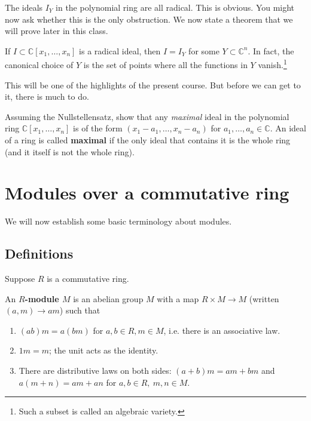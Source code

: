 The ideals $I_Y$ in the polynomial ring are all radical. This is obvious. You
might now ask whether this is the only obstruction. We now state a theorem that
we will prove later in this class.

\begin{theorem} If $I \subset \mathbb{C}[x_1, \dots,
x_n]$ is a radical ideal, then $I = I_Y$ for some $Y \subset \mathbb{C}^n$. In
fact, the canonical choice of $Y$ is the set of points where all the functions
in $Y$ vanish.\footnote{Such a subset is called an algebraic variety.}
\end{theorem}

This will be one of the highlights of the present course. But before we can get
to it, there is much to do.

\begin{exercise} Assuming the Nullstellensatz, show that any \emph{maximal}
ideal in the polynomial ring $\mathbb{C}[x_1, \dots, x_n]$ is of the form
$(x_1-a_1, \dots, x_n-a_n)$ for $a_1, \dots, a_n \in \mathbb{C}$. An ideal of a
ring is called \textbf{maximal} if the only ideal that contains it is the whole
ring (and it itself is not the whole ring). \end{exercise}

\section{Modules over a commutative ring}

We will now establish some basic terminology about modules.

\subsection{Definitions} Suppose $R$ is a commutative ring.

\begin{definition} An \textbf{$R$-module $M$} is an abelian group $M$ with a
map $R \times M \to M$ (written $(a,m) \to am$) such that
\begin{enumerate}[\textbf{M} 1] \item $(ab) m = a(bm)$ for $a,b \in R, m \in
M$, i.e. there is an associative law. \item $1m = m$; the unit acts as the
identity. \item There are distributive laws on both sides: $(a+b)m = am + bm$
and $a(m+n) = am + an$ for $a,b \in R, \ m,n \in M$.

\end{enumerate} \end{definition}

